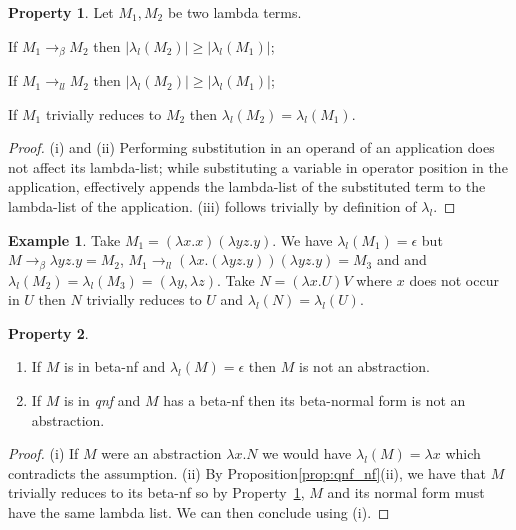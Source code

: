 \documentclass{elsarticle}
\theoremstyle{plain}
\theoremstyle{definition}
\newtheorem{property}{Property}[section]
\newtheorem{example}{Example}[section]
\theoremstyle{remark}
\newcommand{\llred}{\rightarrow_{ll}}
\begin{document}

\begin{property}
\label{property:lambdalist_linearred}
    Let $M_1, M_2$ be two lambda terms.
    \begin{enumerate*}[noitemsep,label=(\roman*)]
        \item If $M_1 \rightarrow_\beta M_2$ then $|\lambda_l(M_2)| \geq
        |\lambda_l(M_1)|$;
        \item If $M_1 \llred M_2$ then $|\lambda_l(M_2)| \geq
        |\lambda_l(M_1)|$;
        \item If $M_1$ trivially reduces to $M_2$ then $\lambda_l(M_2) =
        \lambda_l(M_1)$.
    \end{enumerate*}
\end{property}
\begin{proof}
    (i) and (ii) Performing substitution in an operand of an application does not affect its lambda-list; while substituting a variable in operator position in the application, effectively appends the lambda-list of the substituted term to the lambda-list of the application.
    (iii) follows trivially by definition of $\lambda_l$.
\end{proof}
\begin{example}
Take $M_1 = (\lambda x . x) (\lambda y z . y)$. We have $\lambda_l(M_1) = \epsilon$ but $M \rightarrow_\beta \lambda y z . y = M_2$,
$M_1 \llred (\lambda x . (\lambda y z . y)) (\lambda y z . y) = M_3$ and
and $\lambda_l(M_2) = \lambda_l(M_3) = (\lambda y, \lambda z)$.
Take $N = (\lambda x . U) V$ where $x$ does not occur in $U$ then $N$ trivially reduces to $U$ and $\lambda_l(N) = \lambda_l(U)$.
\end{example}

\begin{property}
\label{prop:qnf_betanf_empty_lambdalist}
    \begin{enumerate}[noitemsep,label=(\roman*)]
    \item If $M$ is in beta-nf and $\lambda_l(M) = \epsilon$ then $M$ is not an abstraction.
    \item If $M$ is in \emph{qnf} and $M$ has a beta-nf then its beta-normal form is not an abstraction.
    \end{enumerate}
\end{property}
\begin{proof}
(i) If $M$ were an abstraction $\lambda x. N$ we would have $\lambda_l(M) = \lambda x$ which contradicts the assumption.
(ii) By Proposition\ref{prop:qnf_nf}(ii), we have that $M$ trivially reduces to
its beta-nf so by Property~\ref{property:lambdalist_linearred},
$M$ and its normal form must have the same lambda list. We can then conclude using (i).
\end{proof}
\end{document}
